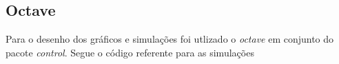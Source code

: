 \documentclass[a4paper,11pt]{article}
\begin{document}
\inputminted[xleftmargin=15pt,linenos,frame=single,framesep=5pt]{python}{../python/exsim2.py}

\subsection{Octave}

Para o desenho dos gráficos e simulações foi utlizado o \textit{octave} em conjunto do pacote \textit{control}. Segue o código referente para as simulações



\end{document}
